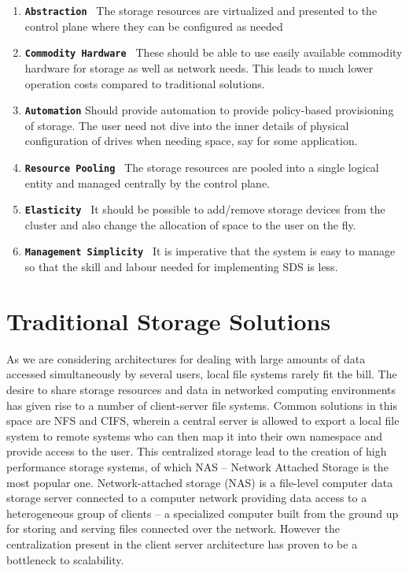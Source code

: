 \documentclass[a4paper,10pt]{article}
\begin{document}
\begin{enumerate}[1]

    \item  \textbf{\texttt{Abstraction }}  The storage resources are virtualized and presented to the control plane where they can be configured as needed
    
    \item  \textbf{\texttt{Commodity Hardware }} These should be able to use easily available commodity hardware for storage as well as network needs. This leads to much lower operation costs compared to traditional solutions.
    
    \item  \textbf{\texttt{Automation}} Should provide automation to provide policy-based provisioning of storage. The user need not dive into the inner details of physical configuration of drives when needing space, say for some application.  
    
    \item  \textbf{\texttt{Resource Pooling }} The storage resources are pooled into a single logical entity and managed centrally by the control plane. 
    
    \item  \textbf{\texttt{Elasticity }} It should be possible to add/remove storage devices from the cluster and also change the allocation of space to the user on the fly.
    
    \item  \textbf{\texttt{Management Simplicity }} It is imperative that the system is easy to manage so that the skill and labour needed for implementing SDS is less.
\end{enumerate}



\newpage
\section{Traditional Storage Solutions}

As we are considering architectures for dealing with large amounts of data accessed simultaneously by several users, local file systems rarely fit the bill. The desire to share storage resources and data in networked computing environments has given rise to a number of client-server file systems. Common solutions in this space are NFS and CIFS, wherein a central server is allowed to export a local file system to remote systems who can then map it into their own namespace and provide access to the user. This centralized storage lead to the creation of high performance storage systems, of which NAS – Network Attached Storage is the most popular one. Network-attached storage (NAS) is a file-level computer data storage server connected to a computer network providing data access to a heterogeneous group of clients – a specialized computer built from the ground up for storing and serving files connected over the network. However the centralization present in the client server architecture has proven to be a bottleneck to scalability. 
\end{document}
